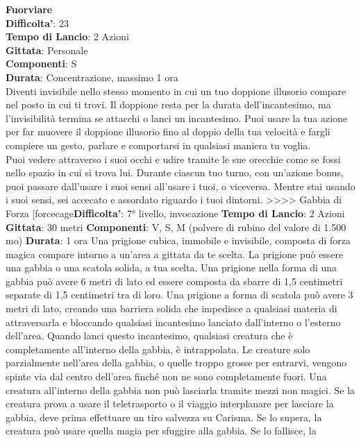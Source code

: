 \begin{multicols}{2}
\medskip\textbf{Fuorviare}\\
\textbf{Difficolta'}: 23\\
\textbf{Tempo di Lancio}: 2 Azioni\\
\textbf{Gittata}: Personale\\
\textbf{Componenti}: S\\
\textbf{Durata}: Concentrazione, massimo 1 ora\\
Diventi invisibile nello stesso momento in cui un tuo doppione illusorio compare nel posto in cui ti trovi. Il doppione resta per la durata dell’incantesimo, ma l’invisibilità termina se attacchi o lanci un incantesimo. Puoi usare la tua azione per far muovere il doppione illusorio fino al doppio della tua velocità e fargli compiere un gesto, parlare e comportarsi in qualsiasi maniera tu voglia.\\
Puoi vedere attraverso i suoi occhi e udire tramite le sue orecchie come se fossi nello spazio in cui si trova lui. Durante ciascun tuo turno, con un’azione bonus, puoi passare dall’usare i suoi sensi all’usare i tuoi, o viceversa. Mentre stai usando i suoi sensi, sei accecato e assordato riguardo i tuoi dintorni. 
>>>>
Gabbia di Forza
[forcecage\textbf{Difficolta'}:
7° livello, invocazione
\textbf{Tempo di Lancio}: 2 Azioni
\textbf{Gittata}: 30 metri
\textbf{Componenti}: V, S, M (polvere di rubino del valore di
1.500 mo)
\textbf{Durata}: 1 ora
Una prigione cubica, immobile e invisibile, composta di
forza magica compare intorno a un’area a gittata da te
scelta. La prigione può essere una gabbia o una scatola
solida, a tua scelta.
Una prigione nella forma di una gabbia può avere 6
metri di lato ed essere composta da sbarre di 1,5
centimetri separate di 1,5 centimetri tra di loro.
Una prigione a forma di scatola può avere 3 metri di
lato, creando una barriera solida che impedisce a
qualsiasi materia di attraversarla e bloccando qualsiasi
incantesimo lanciato dall’interno o l’esterno dell’area.
Quando lanci questo incantesimo, qualsiasi creatura
che è completamente all’interno della gabbia, è
intrappolata. Le creature solo parzialmente nell’area
della gabbia, o quelle troppo grosse per entrarvi,
vengono spinte via dal centro dell’area finché non ne
sono completamente fuori.
Una creatura all’interno della gabbia non può lasciarla
tramite mezzi non magici. Se la creatura prova a usare
il teletrasporto o il viaggio interplanare per lasciare la
gabbia, deve prima effettuare un tiro salvezza su
Carisma. Se lo supera, la creatura può usare quella
magia per sfuggire alla gabbia. Se lo fallisce, la

\end{multicols}

